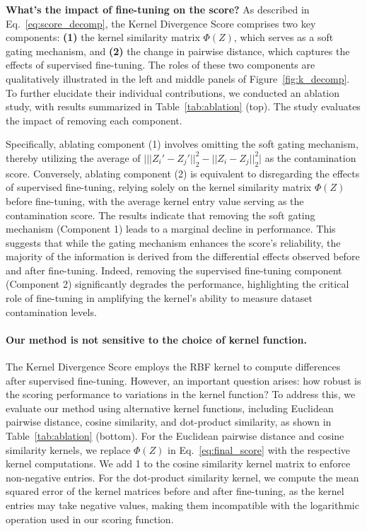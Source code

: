 
\noindent\textbf{What's the impact of fine-tuning on the score?}
As described in Eq.~\eqref{eq:score_decomp}, the Kernel Divergence Score comprises two key components: \textbf{(1)} the kernel similarity matrix $\Phi(Z)$, which serves as a soft gating mechanism, and \textbf{(2)} the change in pairwise distance, which captures the effects of supervised fine-tuning. 
The roles of these two components are qualitatively illustrated in the left and middle panels of Figure~\ref{fig:k_decomp}.
To further elucidate their individual contributions, we conducted an ablation study, with results summarized in Table~\ref{tab:ablation} (top). The study evaluates the impact of removing each component. 

Specifically, ablating component (1) involves omitting the soft gating mechanism, thereby utilizing the average of $\big\vert||Z_i' - Z_j'||_2^2 - ||Z_i - Z_j||_2^2\big\vert$ as the contamination score. 
Conversely, ablating component (2) is equivalent to disregarding the effects of supervised fine-tuning, relying solely on the kernel similarity matrix $\Phi(Z)$ before fine-tuning, with the average kernel entry value serving as the contamination score.
The results indicate that removing the soft gating mechanism (Component 1) leads to a marginal decline in performance. 
This suggests that while the gating mechanism enhances the score's reliability, the majority of the information is derived from the differential effects observed before and after fine-tuning. 
Indeed, removing the supervised fine-tuning component (Component 2) significantly degrades the performance, highlighting the critical role of fine-tuning in amplifying the kernel's ability to measure dataset contamination levels.





\paragraph{Our method is not sensitive to the choice of kernel function.}
The Kernel Divergence Score employs the RBF kernel to compute differences after supervised fine-tuning.
However, an important question arises: how robust is the scoring performance to variations in the kernel function?
To address this, we evaluate our method using alternative kernel functions, including Euclidean pairwise distance, cosine similarity, and dot-product similarity, as shown in Table~\ref{tab:ablation} (bottom).
For the Euclidean pairwise distance and cosine similarity kernels, we replace $\Phi(Z)$ in Eq.~\eqref{eq:final_score} with the respective kernel computations.
We add 1 to the cosine similarity kernel matrix to enforce non-negative entries.
For the dot-product similarity kernel, we compute the mean squared error of the kernel matrices before and after fine-tuning, as the kernel entries may take negative values, making them incompatible with the logarithmic operation used in our scoring function.

